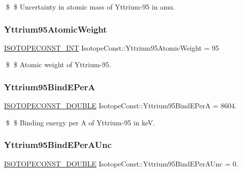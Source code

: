 \$ \$ Uncertainty in atomic mass of Yttrium-\/95 in amu. \mbox{\label{group___isotope_const-_yttrium-_y95_ga82f6f86631e84db16be46bb376a884b4}} 
\subsubsection{\texorpdfstring{Yttrium95\+Atomic\+Weight}{Yttrium95AtomicWeight}}
{\footnotesize\ttfamily \mbox{\hyperlink{group___isotope_const-_macros_ga5f18360b3e99483a35c32d789e62621c}{I\+S\+O\+T\+O\+P\+E\+C\+O\+N\+S\+T\+\_\+\+I\+NT}} Isotope\+Const\+::\+Yttrium95\+Atomic\+Weight = 95}

\$ \$ Atomic weight of Yttrium-\/95. \mbox{\label{group___isotope_const-_yttrium-_y95_ga12a2c9711dc917d7257c215589fdbed7}} 
\subsubsection{\texorpdfstring{Yttrium95\+Bind\+E\+PerA}{Yttrium95BindEPerA}}
{\footnotesize\ttfamily \mbox{\hyperlink{group___isotope_const-_macros_ga8f45a7272ce02c0b4c65c44636ed719a}{I\+S\+O\+T\+O\+P\+E\+C\+O\+N\+S\+T\+\_\+\+D\+O\+U\+B\+LE}} Isotope\+Const\+::\+Yttrium95\+Bind\+E\+PerA = 8604.}

\$ \$ Binding energy per A of Yttrium-\/95 in keV. \mbox{\label{group___isotope_const-_yttrium-_y95_ga9fa92810df6ecc128cbd91d1047fa9ae}} 
\subsubsection{\texorpdfstring{Yttrium95\+Bind\+E\+Per\+A\+Unc}{Yttrium95BindEPerAUnc}}
{\footnotesize\ttfamily \mbox{\hyperlink{group___isotope_const-_macros_ga8f45a7272ce02c0b4c65c44636ed719a}{I\+S\+O\+T\+O\+P\+E\+C\+O\+N\+S\+T\+\_\+\+D\+O\+U\+B\+LE}} Isotope\+Const\+::\+Yttrium95\+Bind\+E\+Per\+A\+Unc = 0.}

